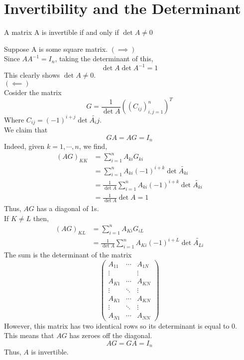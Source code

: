 \documentclass[12pt]{article}
\begin{document}
\section{Invertibility and the Determinant}
\begin{theo}{}
    A matrix A is invertible if and only if \(\det A \neq 0\)
\end{theo}
\begin{prf}{}
Suppose A is some square matrix.
\(\left(\implies\right)\)\\
Since \(AA^{-1} = I_n\), taking the determinant of this,\\
\[\det A \det A^{-1} = 1\]
This clearly shows \(\det A \neq 0\).\\
\(\left(\impliedby \right)\)\\
Cosider the matrix \[G = \frac1{\det A}\left(\left(C_{ij}\right)_{i,j = 1}^n\right)^T\]
Where \(C_{ij} = (-1)^{i+j} \det \tilde{A_ij}\).\\
We claim that \[GA = AG = I_n\]
Indeed, given \(k = 1, \cdots, n\), we find,
\begin{align*}
    \left(AG\right)_{KK} &= \displaystyle\sum_{i=1}^n A_{ki} G_{ki} \\
    &= \displaystyle\sum_{i=1}^n A_{ki}(-1)^{i+k} \det \tilde{A_{ki}}\\
    &= \frac1{\det A}\displaystyle\sum_{i=1}^n A_{ki}(-1)^{i+k}\det \tilde{A_{ki}}\\
    &= \frac{1}{\det A} \det A = 1
\end{align*}
Thus, \(AG\) has a diagonal of 1s.\\
If \(K \neq L\) then,\\
\begin{align*}
    \left(AG\right)_{KL} &= \displaystyle\sum_{i=1}^n A_{Ki}G_{iL}\\
    &= \frac{1}{\det A} \displaystyle\sum_{i=1}^n A_{Ki}(-1)^{i+L} \det \tilde{A_{Li}}
\end{align*}
The sum is the determinant of the matrix
\[\begin{pmatrix}
    A_{11} & \cdots & A_{1N}\\
    \vdots & & \vdots\\
    A_{K1} & \cdots & A_{KN}\\
    \vdots & \ddots & \vdots\\
    A_{K1} & \cdots & A_{KN}\\
    \vdots & \ddots & \vdots\\
    A_{N1} & \cdots & A_{NN}
\end{pmatrix}\]
However, this matrix has two identical rows so its determinant is equal to 0.\\
This means that \(AG\) has zeroes off the diagonal.\\
\[AG = GA = I_n\]
Thus, \(A\) is invertible.
\end{prf}
\end{document}
